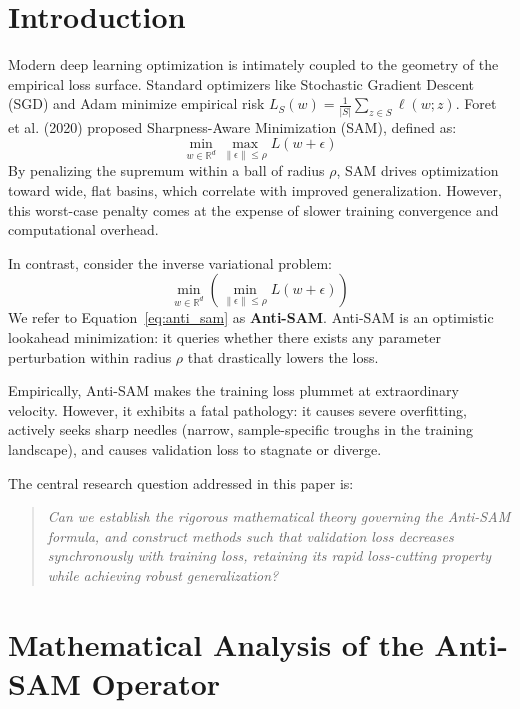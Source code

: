 \documentclass[11pt,a4paper]{article}
\begin{document}
\section{Introduction}
Modern deep learning optimization is intimately coupled to the geometry of the empirical loss surface. Standard optimizers like Stochastic Gradient Descent (SGD) and Adam minimize empirical risk $L_S(w) = \frac{1}{|S|}\sum_{z \in S} \ell(w; z)$. Foret et al. (2020) proposed Sharpness-Aware Minimization (SAM), defined as:
\begin{equation}
\min_{w \in \mathbb{R}^d} \max_{\|\epsilon\| \le \rho} L(w + \epsilon)
\end{equation}
By penalizing the supremum within a ball of radius $\rho$, SAM drives optimization toward wide, flat basins, which correlate with improved generalization. However, this worst-case penalty comes at the expense of slower training convergence and computational overhead.

In contrast, consider the inverse variational problem:
\begin{equation}
\label{eq:anti_sam}
\min_{w \in \mathbb{R}^d} \left( \min_{\|\epsilon\| \le \rho} L(w + \epsilon) \right)
\end{equation}
We refer to Equation~\eqref{eq:anti_sam} as \textbf{Anti-SAM}. Anti-SAM is an optimistic lookahead minimization: it queries whether there exists any parameter perturbation within radius $\rho$ that drastically lowers the loss.

Empirically, Anti-SAM makes the training loss plummet at extraordinary velocity. However, it exhibits a fatal pathology: it causes severe overfitting, actively seeks sharp needles (narrow, sample-specific troughs in the training landscape), and causes validation loss to stagnate or diverge.

The central research question addressed in this paper is:
\begin{quote}
\textit{Can we establish the rigorous mathematical theory governing the Anti-SAM formula, and construct methods such that validation loss decreases synchronously with training loss, retaining its rapid loss-cutting property while achieving robust generalization?}
\end{quote}

\section{Mathematical Analysis of the Anti-SAM Operator}
\end{document}
